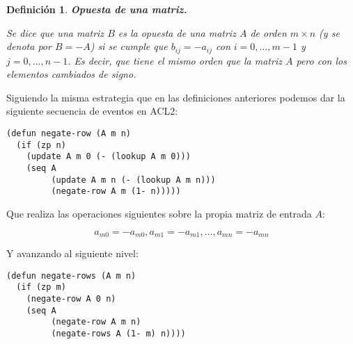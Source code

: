 \documentclass[a4paper,10pt]{article}
\newtheorem{defi}{{Definición}}
\begin{document}
\par \vspace{12pt}

\begin{defi} \textbf{Opuesta de una matriz.}\vspace{8pt}\par
Se dice que una matriz $B$ es la \emph{opuesta} de una matriz $A$ de orden $m \times n$ (y se denota por $B = -A$) si se cumple que $b_{ij} = -a_{ij}$ con $i = 0, \dots, m-1$ y $j = 0, \dots, n-1$. Es decir, que tiene el mismo orden que la matriz $A$ pero con los elementos cambiados de signo.
\end{defi}

\par \vspace{10pt}

Siguiendo la misma estrategia que en las definiciones anteriores podemos dar la siguiente secuencia de eventos en ACL2:

\par \vspace{10pt}

\begin{lstlisting}[language=clips]
(defun negate-row (A m n)
  (if (zp n)
    (update A m 0 (- (lookup A m 0)))
    (seq A
         (update A m n (- (lookup A m n)))
         (negate-row A m (1- n)))))
\end{lstlisting}

\par \vspace{10pt}

Que realiza las operaciones siguientes sobre la propia matriz de entrada $A$:

\par \vspace{10pt}

$$
a_{m0} = -a_{m0},a_{m1} = -a_{m1},\dots,a_{mn} = -a_{mn}
$$

\par \vspace{10pt}	

Y avanzando al siguiente nivel:

\par \vspace{10pt}	

\begin{lstlisting}[language=clips]
(defun negate-rows (A m n)
  (if (zp m)
    (negate-row A 0 n)
    (seq A
         (negate-row A m n)
         (negate-rows A (1- m) n))))
\end{lstlisting}
\end{document}
